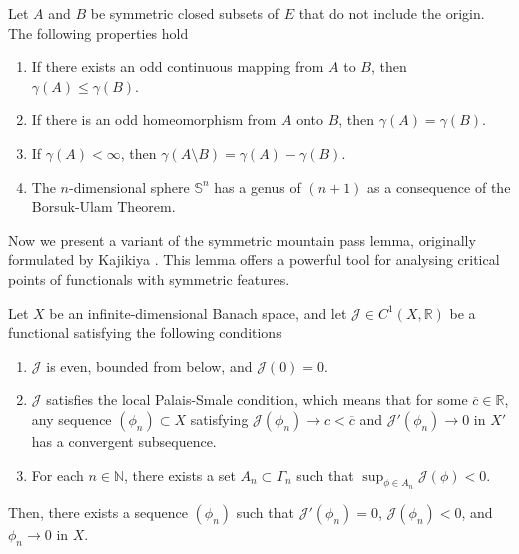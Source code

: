 \documentclass[reqno]{amsart}
\begin{document}
\begin{proposition}\label{prop}
Let $A$ and $B$ be symmetric closed subsets of $E$ that do not include the origin. 
The following properties hold
\begin{enumerate}
\item If there exists an odd continuous mapping from $A$ to $B$, then $\gamma(A)\leq \gamma(B)$.
\item If there is an odd homeomorphism from $A$ onto $B$, then $\gamma(A)= \gamma(B)$.
\item If $\gamma(A)<\infty$, then $\gamma(A\setminus B)=\gamma(A)-\gamma(B)$.
\item The $n$-dimensional sphere $\mathbb{S}^n$ has a genus of $(n+1)$ as a 
consequence of the Borsuk-Ulam Theorem.
\end{enumerate}
\end{proposition}

Now we present a variant of the symmetric mountain pass lemma, originally formulated 
by Kajikiya \cite{n}. This lemma offers a powerful tool for analysing critical points 
of functionals with symmetric features.

\begin{lemma} \label{kajikiya}
Let $X$ be an infinite-dimensional Banach space, and let 
$\mathcal{J}\in C^1(X,\mathbb{R})$ be a functional satisfying the following 
conditions
\begin{enumerate}
\item  $\mathcal{J}$ is even, bounded from below, and $\mathcal{J}(0)=0$.
\item  $\mathcal{J}$ satisfies the local Palais-Smale condition, which means 
 that for some $\overline{c}\in\mathbb{R}$, any sequence $(\phi_n)\subset X$ 
 satisfying $\mathcal{J}(\phi_n)\to c<\overline{c}$ and $\mathcal{J}'(\phi_n)\to 0$ 
 in $X'$ has a convergent subsequence.
\item  For each $n\in \mathbb{N}$, there exists a set $A_n\subset \Gamma_n$ such that 
$\sup_{\phi\in A_n}\mathcal{J}(\phi)<0$.
\end{enumerate}
Then, there exists a sequence $(\phi_n)$ such that $\mathcal{J}'(\phi_n)=0$, 
$\mathcal{J}(\phi_n)<0$, and $\phi_n\to 0$ in $X$.
\end{lemma}
\end{document}

